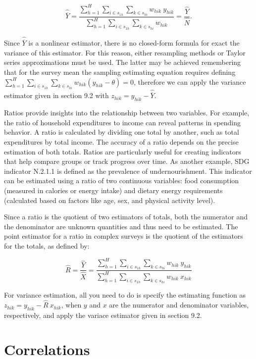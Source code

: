 \documentclass[
  12pt,
]{book}
\begin{document}
\[
\widehat{\overline{Y}} = \frac{\sum_{h=1}^{H}\sum_{i \in s_{1h}} \sum_{ k \in s_{hi}} w_{hik} \ y_{hik}} {\sum_{h=1}^{H}\sum_{i \in s_{1h}} \sum_{ k \in s_{hi}} w_{hik}} = \frac{\widehat{Y}}{\widehat{N}}.
\]

Since \(\widehat{\overline{Y}}\) is a nonlinear estimator, there is no closed-form formula for exact the variance of this estimator. For this reason, either resampling methods or Taylor series approximations must be used. The latter may be achieved remembering that for the survey mean the sampling estimating equation requires defining \(\sum_{h=1}^{H}\sum_{i \in s_{1h}} \sum_{ k \in s_{hi}} w_{hik} (y_{hik} - \theta) = 0\), therefore we can apply the variance estimator given in section 9.2 with \(z_{hik} = y_{hik} - \widehat{\overline{Y}}\).

Ratios provide insights into the relationship between two variables. For example, the ratio of household expenditures to income can reveal patterns in spending behavior. A ratio is calculated by dividing one total by another, such as total expenditures by total income. The accuracy of a ratio depends on the precise estimation of both totals. Ratios are particularly useful for creating indicators that help compare groups or track progress over time. As another example, SDG indicator N.2.1.1 is defined as the prevalence of undernourishment. This indicator can be estimated using a ratio of two continuous variables: food consumption (measured in calories or energy intake) and dietary energy requirements (calculated based on factors like age, sex, and physical activity level).

Since a ratio is the quotient of two estimators of totals, both the numerator and the denominator are unknown quantities and thus need to be estimated. The point estimator for a ratio in complex surveys is the quotient of the estimators for the totals, as defined by:

\[
\widehat{R} = \frac{\widehat{Y}}{\widehat{X}}
= \frac{\sum_{h=1}^{H}\sum_{i \in s_{1h}} \sum_{ k \in s_{hi}}  w_{hik} \ y_{hik}}{\sum_{h=1}^{H}\sum_{i \in s_{1h}} \sum_{ k \in s_{hi}}  w_{hik} \ x_{hik}}
\]

For variance estimation, all you need to do is specify the estimating function as \(z_{hik} = y_{hik} - \widehat{R} \ x_{hik}\), when \(y\) and \(x\) are the numerator and denominator variables, respectively, and apply the variace estimator given in section 9.2.

\hypertarget{correlations}{%
\section{Correlations}\label{correlations}}
\end{document}

